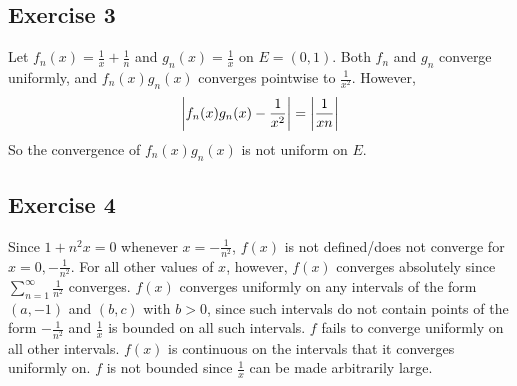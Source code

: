 \subsection{Exercise 3}
Let $f_n(x) = \frac{1}{x} + \frac{1}{n}$ and $g_n(x) = \frac{1}{x}$ on $E = (0, 1)$. 
Both $f_n$ and $g_n$ converge uniformly, and $f_n(x) g_n(x)$ converges pointwise to $\frac{1}{x^2}$. However,
\begin{align*}
        \abs{f_n(x) g_n(x) - \frac{1}{x^2}} = \abs{\frac{1}{xn}}
\end{align*}
So the convergence of $f_n(x) g_n(x)$ is not uniform on  $E$.

\subsection{Exercise 4}
Since $1 + n^2 x = 0$ whenever $x = -\frac{1}{n^2}$, $f(x)$ is not defined/does not converge for 
$x = 0, -\frac{1}{n^2}$. For all other values of  $x$, however, $f(x)$ converges absolutely since 
$\sum_{n = 1}^\infty \frac{1}{n^2}$ converges. $f(x)$ converges uniformly on any intervals of the form 
$(a, -1)$ and $(b, c)$ with $b > 0$, since such intervals do not contain points of the form $-\frac{1}{n^2}$
and $\frac{1}{x}$ is bounded on all such intervals. $f$ fails to converge uniformly on all other intervals.
$f(x)$ is continuous on the intervals that it converges uniformly on.
$f$ is not bounded since $\frac{1}{x}$ can be made arbitrarily large.
